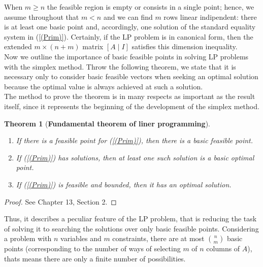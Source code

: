 \documentclass[a4paper,10 pt,titlepage,twoside]{book}
\theoremstyle{plain}
\newtheorem{thm}{Theorem}[chapter]
\theoremstyle{definition}
\theoremstyle{remark}
\begin{document}
When $m \geq n$ the feasible region is empty or consists in a single point; hence, we assume throughout that $m < n$ and we can find $m$ rows linear indipendent: there is at least one basic point and, accordingly, one solution of the standard equality system in (\ref{(Prim)}). Certainly, if the LP problem is in canonical form, then the extended $m \times (n+m)$ matrix $[A\;|\;I]$ 
satisfies this dimension inequality. \\
Now we outline the importance of basic feasible points in solving LP problems with the simplex method.
Throw the following theorem, we state that it is necessary only to consider basic feasible
vectors when seeking an optimal solution because the optimal
value is always achieved at such a solution.\\ The method to prove the theorem is in many respects as important as the result itself, since it represents the beginning of the development of the simplex
method.
\begin{thm}[\textbf{Fundamental theorem of liner programming}]\label{Fund}
\begin{enumerate}
	\
\item If there is a feasible point for (\ref{(Prim)}), then there is a basic feasible point.
\item If (\ref{(Prim)}) has solutions, then at least one such solution is a basic optimal point.
\item If (\ref{(Prim)}) is feasible and bounded, then it has an optimal solution.
\end{enumerate}
\end{thm}
\begin{proof}
	See \cite{W} Chapter 13, Section 2.
\end{proof}
Thus, it describes a peculiar feature of the LP problem, that is reducing the task of solving it to searching the solutions over only basic feasible points. Considering a problem with $n$ variables and $m$ constraints, there are at most ${n}\choose{m}$ basic points (corresponding to the number of ways of selecting $m$ of $n$ columns of $A$), thats means there are only a finite number of possibilities.\\[0.5cm] 
\end{document}
